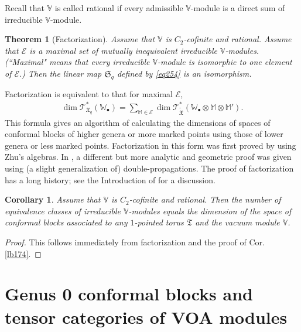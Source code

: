 \documentclass[12pt,a4paper,notitlepage]{article}
\theoremstyle{definition}
\theoremstyle{plain}
\newtheorem{thm}[df]{Theorem}
\newtheorem{co}[df]{Corollary}
\newcommand{\fk}{\mathfrak}
\newcommand{\mc}{\mathcal}
\newcommand{\wtd}{\widetilde}
\newcommand{\scr}{\mathscr}
\newcommand{\blt}{\bullet}
\newcommand{\Vbb}{\mathbb V}
\newcommand{\Wbb}{\mathbb W}
\newcommand{\Mbb}{\mathbb M}
\numberwithin{equation}{section}
\begin{document}
Recall that $\Vbb$ is called rational if every admissible $\Vbb$-module is a direct sum of irreducible $\Vbb$-module.

\begin{thm}[Factorization]\label{lb181}
Assume that $\Vbb$ is $C_2$-cofinite and rational. Assume that $\mc E$ is a maximal set of mutually inequivalent irreducible $\Vbb$-modules. (``Maximal" means that every irreducible $\Vbb$-module is isomorphic to one element of $\mc E$.) Then the linear map $\fk S_q$ defined by \eqref{eq254} is an isomorphism.
\end{thm}


Factorization is equivalent to that for maximal $\mc E$,
\begin{align}
\dim\scr T_{\fk X_q}^*(\Wbb_\blt)=\sum_{\Mbb\in\mc E}\dim\scr T_{\wtd{\fk X}}^*(\Wbb_\blt\otimes\Mbb\otimes\Mbb').
\end{align}
This formula gives an algorithm of calculating the dimensions of spaces of conformal blocks of higher genera or more marked points using those of lower genera or less marked points. Factorization in this form was first proved by \cite{DGT19} using Zhu's algebras. In \cite[Sec. 4.6, 4.7]{Gui}, a different but more analytic and geometric proof was given using (a slight generalization of) double-propagations. The proof of factorization has a long history; see the Introduction of \cite{DGT19} for a discussion.



\begin{co}
Assume that $\Vbb$ is $C_2$-cofinite and rational. Then the number of equivalence classes of irreducible $\Vbb$-modules equals the dimension of the space of conformal blocks associated to any $1$-pointed torus $\fk T$ and the vacuum module $\Vbb$. 
\end{co}
\begin{proof}
This follows immediately from factorization and the proof of Cor. \ref{lb174}.
\end{proof}



\section{Genus 0 conformal blocks and tensor categories of VOA modules}


\subsection{}
\end{document}

